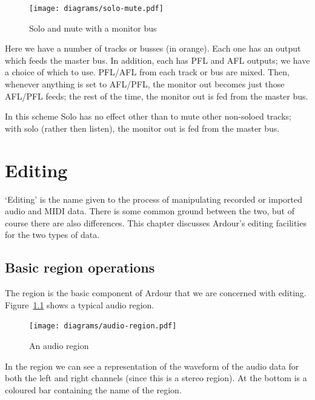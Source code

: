 \documentclass[10pt,a4paper]{book}
\begin{document}
\begin{figure}[ht]
\begin{center}
\texttt{[image: diagrams/solo-mute.pdf]}
\end{center}
\caption{Solo and mute with a monitor bus}
\label{fig:solo-mute}
\end{figure}

Here we have a number of tracks or busses (in orange).  Each one has
an output which feeds the master bus.  In addition, each has PFL and
AFL outputs; we have a choice of which to use.  PFL/AFL from each
track or bus are mixed.  Then, whenever anything is set to AFL/PFL,
the monitor out becomes just those AFL/PFL feeds; the rest of the
time, the monitor out is fed from the master bus.

In this scheme Solo has no effect other than to mute other non-soloed
tracks; with solo (rather then listen), the monitor out is fed from
the master bus.



\chapter{Editing}

`Editing' is the name given to the process of manipulating recorded or
imported audio and MIDI data.  There is some common ground between the
two, but of course there are also differences.  This chapter discusses
Ardour's editing facilities for the two types of data.


\section{Basic region operations}

The region is the basic component of Ardour that we are concerned with
editing.  Figure~\ref{fig:audio-region} shows a typical audio region.

\begin{figure}[ht]
\begin{center}
\texttt{[image: diagrams/audio-region.pdf]}
\end{center}
\caption{An audio region}
\label{fig:audio-region}
\end{figure}

In the region we can see a representation of the waveform of the audio
data for both the left and right channels (since this is a stereo
region).  At the bottom is a coloured bar containing the name of the
region.
\end{document}
